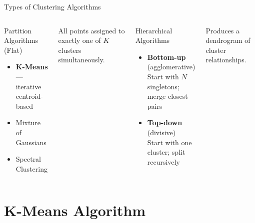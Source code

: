 \documentclass{beamer}
\begin{document}
\begin{frame}{Types of Clustering Algorithms}

\begin{columns}[T]
\begin{minipage}[t][0.72\textheight][t]{\linewidth}
\begin{block}{Partition Algorithms (Flat)}
\begin{itemize}
  \item \textbf{K-Means} — iterative centroid-based
  \item Mixture of Gaussians
  \item Spectral Clustering
\end{itemize}
\end{block}
\vspace{0.3cm}
{\small All points assigned to exactly one of $K$ clusters simultaneously.}
\end{minipage}

\begin{minipage}[t][0.72\textheight][t]{\linewidth}
\begin{alertblock}{Hierarchical Algorithms}
\begin{itemize}
  \item \textbf{Bottom-up} (agglomerative)\\
        Start with $N$ singletons; merge closest pairs
  \item \textbf{Top-down} (divisive)\\
        Start with one cluster; split recursively
\end{itemize}
\end{alertblock}
\vspace{0.3cm}
{\small Produces a dendrogram of cluster relationships.}
\end{minipage}
\end{columns}

\end{frame}

\section{K-Means Algorithm}
\end{document}
